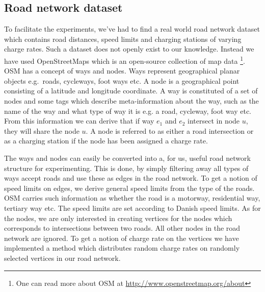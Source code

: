 \subsection{Road network dataset} 
\label{sub:setup}
To facilitate the experiments, we've had to find a real world road network dataset which contains road distances, speed limits and charging stations of varying charge rates. Such a dataset does not openly exist to our knowledge. Instead we have used OpenStreetMaps which is an open-source collection of map data \footnote{One can read more about OSM at \url{http://www.openstreetmap.org/about}}. OSM has a concept of ways and nodes. Ways represent geographical planar objects e.g.\ roads, cycleways, foot ways etc. A node is a geographical point consisting of a latitude and longitude coordinate. A way is constituted of a set of nodes and some tags which describe meta-information about the way, such as the name of the way and what type of way it is e.g. a road, cycleway, foot way  etc. From this information we can derive that if way $e_1$ and $e_2$ intersect in node $u$, they will share the node $u$. A node is referred to as either a road intersection or as a charging station if the node has been assigned a charge rate.

The ways and nodes can easily be converted into a, for us, useful road network structure for experimenting. This is done, by simply filtering away all types of ways accept roads and use these as edges in the road network. To get a notion of speed limits on edges, we derive general speed limits from the type of the roads. OSM carries such information as whether the road is a motorway, residential way, tertiary way etc. The speed limits are set according to Danish speed limits. As for the nodes, we are only interested in creating vertices for the nodes which corresponds to intersections between two roads. All other nodes in the road network are ignored. To get a notion of charge rate on the vertices we have implemented a method which distributes random charge rates on randomly selected vertices in our road network.

